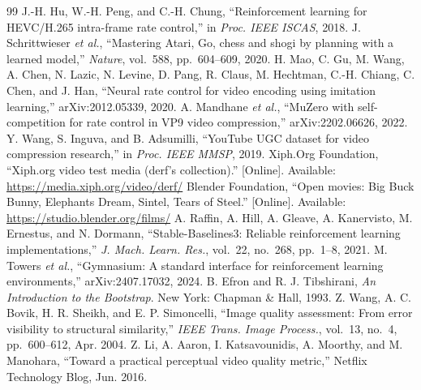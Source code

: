 \documentclass[conference]{IEEEtran}
\begin{document}
\begin{thebibliography}{99}
 J.-H. Hu, W.-H. Peng, and C.-H. Chung, ``Reinforcement learning for HEVC/H.265 intra-frame rate control,'' in \emph{Proc. IEEE ISCAS}, 2018.
 J. Schrittwieser \emph{et al.}, ``Mastering Atari, Go, chess and shogi by planning with a learned model,'' \emph{Nature}, vol.~588, pp.~604--609, 2020.
 H. Mao, C. Gu, M. Wang, A. Chen, N. Lazic, N. Levine, D. Pang, R. Claus, M. Hechtman, C.-H. Chiang, C. Chen, and J. Han, ``Neural rate control for video encoding using imitation learning,'' arXiv:2012.05339, 2020.
 A. Mandhane \emph{et al.}, ``MuZero with self-competition for rate control in VP9 video compression,'' arXiv:2202.06626, 2022.
 Y. Wang, S. Inguva, and B. Adsumilli, ``YouTube UGC dataset for video compression research,'' in \emph{Proc. IEEE MMSP}, 2019.
 Xiph.Org Foundation, ``Xiph.org video test media (derf's collection).'' [Online]. Available: \url{https://media.xiph.org/video/derf/}
 Blender Foundation, ``Open movies: Big Buck Bunny, Elephants Dream, Sintel, Tears of Steel.'' [Online]. Available: \url{https://studio.blender.org/films/}
 A. Raffin, A. Hill, A. Gleave, A. Kanervisto, M. Ernestus, and N. Dormann, ``Stable-Baselines3: Reliable reinforcement learning implementations,'' \emph{J. Mach. Learn. Res.}, vol.~22, no.~268, pp.~1--8, 2021.
 M. Towers \emph{et al.}, ``Gymnasium: A standard interface for reinforcement learning environments,'' arXiv:2407.17032, 2024.
 B. Efron and R. J. Tibshirani, \emph{An Introduction to the Bootstrap}. New York: Chapman \& Hall, 1993.
 Z. Wang, A. C. Bovik, H. R. Sheikh, and E. P. Simoncelli, ``Image quality assessment: From error visibility to structural similarity,'' \emph{IEEE Trans. Image Process.}, vol.~13, no.~4, pp.~600--612, Apr. 2004.
 Z. Li, A. Aaron, I. Katsavounidis, A. Moorthy, and M. Manohara, ``Toward a practical perceptual video quality metric,'' Netflix Technology Blog, Jun. 2016.
\end{thebibliography}
\end{document}
